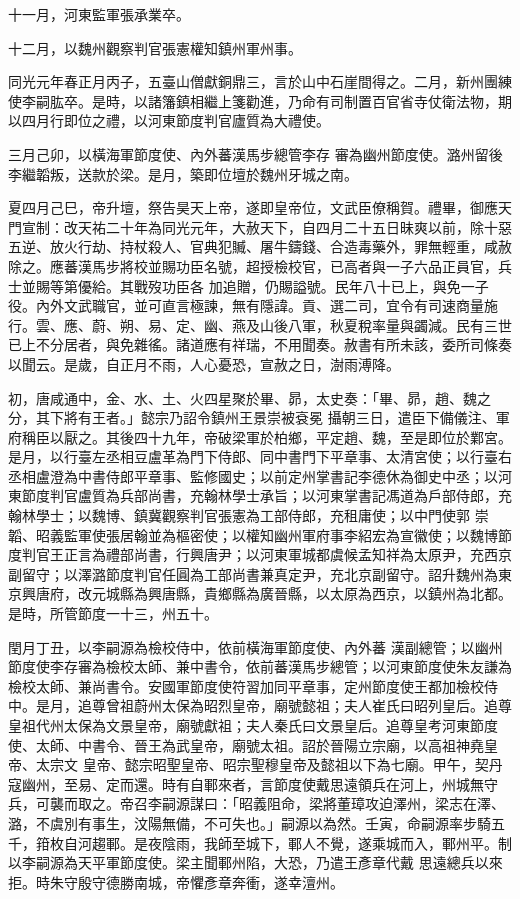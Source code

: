 \begin{pinyinscope}
 十一月，河東監軍張承業卒。



 十二月，以魏州觀察判官張憲權知鎮州軍州事。



 同光元年春正月丙子，五臺山僧獻銅鼎三，言於山中石崖間得之。二月，新州團練使李嗣肱卒。是時，以諸籓鎮相繼上箋勸進，乃命有司制置百官省寺仗衛法物，期以四月行即位之禮，以河東節度判官廬質為大禮使。



 三月己卯，以橫海軍節度使、內外蕃漢馬步總管李存
 審為幽州節度使。潞州留後李繼韜叛，送款於梁。是月，築即位壇於魏州牙城之南。



 夏四月己巳，帝升壇，祭告昊天上帝，遂即皇帝位，文武臣僚稱賀。禮畢，御應天門宣制：改天祐二十年為同光元年，大赦天下，自四月二十五日昧爽以前，除十惡五逆、放火行劫、持杖殺人、官典犯贓、屠牛鑄錢、合造毒藥外，罪無輕重，咸赦除之。應蕃漢馬步將校並賜功臣名號，超授檢校官，已高者與一子六品正員官，兵士並賜等第優給。其戰歿功臣各
 加追贈，仍賜謚號。民年八十已上，與免一子役。內外文武職官，並可直言極諫，無有隱諱。貢、選二司，宜令有司速商量施行。雲、應、蔚、朔、易、定、幽、燕及山後八軍，秋夏稅率量與蠲減。民有三世已上不分居者，與免雜徭。諸道應有祥瑞，不用聞奏。赦書有所未該，委所司條奏以聞云。是歲，自正月不雨，人心憂恐，宣赦之日，澍雨溥降。



 初，唐咸通中，金、水、土、火四星聚於畢、昴，太史奏：「畢、昴，趙、魏之分，其下將有王者。」懿宗乃詔令鎮州王景崇被袞冕
 攝朝三日，遣臣下備儀注、軍府稱臣以厭之。其後四十九年，帝破梁軍於柏鄉，平定趙、魏，至是即位於鄴宮。是月，以行臺左丞相豆盧革為門下侍郎、同中書門下平章事、太清宮使；以行臺右丞相盧澄為中書侍郎平章事、監修國史；以前定州掌書記李德休為御史中丞；以河東節度判官盧質為兵部尚書，充翰林學士承旨；以河東掌書記馮道為戶部侍郎，充翰林學士；以魏博、鎮冀觀察判官張憲為工部侍郎，充租庸使；以中門使郭
 崇韜、昭義監軍使張居翰並為樞密使；以權知幽州軍府事李紹宏為宣徽使；以魏博節度判官王正言為禮部尚書，行興唐尹；以河東軍城都虞候孟知祥為太原尹，充西京副留守；以澤潞節度判官任圓為工部尚書兼真定尹，充北京副留守。詔升魏州為東京興唐府，改元城縣為興唐縣，貴鄉縣為廣晉縣，以太原為西京，以鎮州為北都。是時，所管節度一十三，州五十。



 閏月丁丑，以李嗣源為檢校侍中，依前橫海軍節度使、內外蕃
 漢副總管；以幽州節度使李存審為檢校太師、兼中書令，依前蕃漢馬步總管；以河東節度使朱友謙為檢校太師、兼尚書令。安國軍節度使符習加同平章事，定州節度使王都加檢校侍中。是月，追尊曾祖蔚州太保為昭烈皇帝，廟號懿祖；夫人崔氏曰昭列皇后。追尊皇祖代州太保為文景皇帝，廟號獻祖；夫人秦氏曰文景皇后。追尊皇考河東節度使、太師、中書令、晉王為武皇帝，廟號太祖。詔於晉陽立宗廟，以高祖神堯皇帝、太宗文
 皇帝、懿宗昭聖皇帝、昭宗聖穆皇帝及懿祖以下為七廟。甲午，契丹寇幽州，至易、定而還。時有自鄆來者，言節度使戴思遠領兵在河上，州城無守兵，可襲而取之。帝召李嗣源謀曰：「昭義阻命，梁將董璋攻迫澤州，梁志在澤、潞，不虞別有事生，汶陽無備，不可失也。」嗣源以為然。壬寅，命嗣源率步騎五千，箝枚自河趨鄆。是夜陰雨，我師至城下，鄆人不覺，遂乘城而入，鄆州平。制以李嗣源為天平軍節度使。梁主聞鄆州陷，大恐，乃遣王彥章代戴
 思遠總兵以來拒。時朱守殷守德勝南城，帝懼彥章奔衝，遂幸澶州。




\end{pinyinscope}
